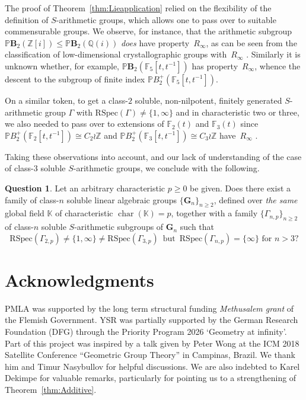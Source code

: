 \documentclass[a4paper,11pt]{amsart}
\numberwithin{equation}{section}
\theoremstyle{plain}
\theoremstyle{definition}
\newtheorem{qst}[thm]{Question}
\newcommand{\Z}{\mathbb{Z}}
\newcommand{\Q}{\mathbb{Q}}
\newcommand{\K}{\mathbb{K}}
\newcommand{\F}{\mathbb{F}}
\newcommand{\mbG}{\mathbf{G}} %
\newcommand{\PB}{\mathbb{P}\mathbf{B}} %
\newcommand{\PBplus}{\mathbb{P}B^{+}} %
\newcommand{\Ri}{R_{\infty}} %
\newcommand{\RSpec}{\mathrm{RSpec}}
\DeclareMathOperator{\carac}{char}
\begin{document}
The proof of Theorem~\ref{thm:Lieapplication} relied on the flexibility of the definition of $S$-arithmetic groups, which allows one to pass over to suitable commensurable groups. We observe, for instance, that the arithmetic subgroup $\PB_2(\Z[i]) \leq \PB_2(\Q(i))$ \emph{does} have property~$\Ri$, as can be seen from the classification of low-dimensional crystallographic groups with~$\Ri$ \cite{KarelPenni}. Similarly it is unknown whether, for example, $\PB_2(\F_5[t,t^{-1}])$ has property~$\Ri$, whence the descent to the subgroup of finite index $\PBplus_2(\F_5[t,t^{-1}])$.

On a similar token, to get a class-$2$ soluble, non-nilpotent, finitely generated $S$-arithmetic group $\Gamma$ with $\RSpec(\Gamma) \neq \{1,\infty\}$ and in characteristic two or three, we also needed to pass over to extensions of $\F_2(t)$ and $\F_3(t)$ since $\PBplus_2(\F_2[t,t^{-1}]) \cong C_2 \wr \Z$ and $\PBplus_2(\F_3[t,t^{-1}]) \cong C_3 \wr \Z$ have~$\Ri$ \cite{DacibergWongWreath}.

Taking these observations into account, and our lack of understanding of the case of class-$3$ soluble $S$-arithmetic groups, we conclude with the following. 

\begin{qst}
Let an arbitrary characteristic $p \geq 0$ be given. Does there exist a family of class-$n$ soluble linear algebraic groups $\{\mbG_n\}_{n\geq 2}$, defined over \emph{the same} global field $\K$ of characteristic $\carac(\K) = p$, together with a family $\{\Gamma_{n,p}\}_{n\geq 2}$ of class-$n$ soluble $S$-arithmetic subgroups of $\mbG_n$ such that 
\[ \RSpec(\Gamma_{2,p}) \neq \{1,\infty\} \neq \RSpec(\Gamma_{3,p}) \, \text{ but } \, \RSpec(\Gamma_{n,p}) = \{\infty\} \text{ for } n > 3? \]
\end{qst}


\section*{Acknowledgments}
PMLA was supported by the long term structural funding \emph{Methusalem grant} of the Flemish Government. YSR was partially supported by the German Research Foundation (DFG) through the Priority Program 2026 `Geometry at infinity'. 
Part of this project was inspired by a talk given by Peter Wong at the ICM 2018 Satellite Conference ``Geometric Group Theory'' in Campinas, Brazil. We thank him and Timur Nasybullov for helpful discussions. We are also indebted to Karel Dekimpe for valuable remarks, particularly for pointing us to a strengthening of Theorem~\ref{thm:Additive}.


 \def\cprime{$'$} \def\cprime{$'$}
 \providecommand{\bysame}{\leavevmode\hbox to3em{\hrulefill}\thinspace}
 \providecommand{\MR}{\relax\ifhmode\unskip\space\fi MR }

\printbibliography
\end{document}
